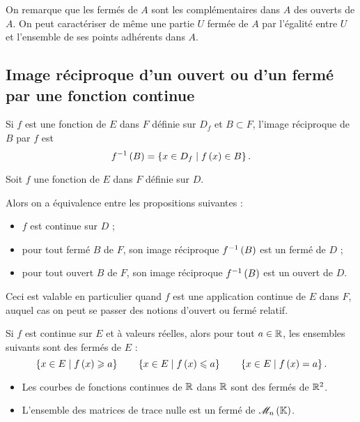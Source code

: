 On remarque que les fermés de \(A\) sont les complémentaires dans \(A\) des ouverts de \(A\). On peut caractériser de même une partie \(U\) fermée de \(A\) par l'égalité entre \(U\) et l'ensemble de ses points adhérents dans \(A\).

\subsection{Image réciproque d'un ouvert ou d'un fermé par une fonction continue}

\begin{rappel}
Si \(f\) est une fonction de \(E\) dans \(F\) définie sur \(D_f\) et \(B\subset F\), l'image réciproque de \(B\) par \(f\) est \[f^{-1}\left(B\right)=\left\lbrace x\in D_f\;\middle|\; f\left(x\right)\in B\right\rbrace.\]
\end{rappel}

\begin{theo}
Soit \(f\) une fonction de \(E\) dans \(F\) définie sur \(D\).

Alors on a équivalence entre les propositions suivantes :

\begin{itemize}
    \item \(f\) est continue sur \(D\) ; \\
    \item pour tout fermé \(B\) de \(F\), son image réciproque \(f^{-1}\left(B\right)\) est un fermé de \(D\) ; \\
    \item pour tout ouvert \(B\) de \(F\), son image réciproque \(f^{-1}\left(B\right)\) est un ouvert de \(D\).
\end{itemize}

Ceci est valable en particulier quand \(f\) est une application continue de \(E\) dans \(F\), auquel cas on peut se passer des notions d'ouvert ou fermé relatif.
\end{theo}

\begin{ex}
Si \(f\) est continue sur \(E\) et à valeurs réelles, alors pour tout \(a\in\mathbb{R}\), les ensembles suivants sont des fermés de \(E\) : \[\left\lbrace x\in E\;\middle|\; f\left(x\right)\geqslant a\right\rbrace\qquad\left\lbrace x\in E\;\middle|\; f\left(x\right)\leqslant a\right\rbrace\qquad\left\lbrace x\in E\;\middle|\; f\left(x\right)=a\right\rbrace.\]
\end{ex}

\begin{ex}
\begin{itemize}
    \item Les courbes de fonctions continues de \(\mathbb{R}\) dans \(\mathbb{R}\) sont des fermés de \(\mathbb{R}^2\). \\
    \item L'ensemble des matrices de trace nulle est un fermé de \(\M{n}\).
\end{itemize}
\end{ex}


